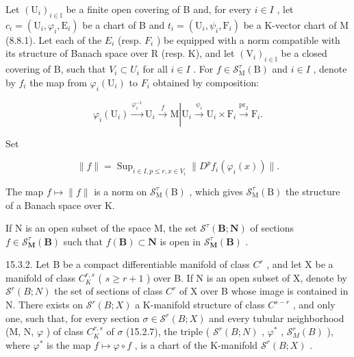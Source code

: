 Let \((\mathrm{U}_{i})_{i\in\mathbb{I}}\) be a finite open covering of B and, for every \(i\in I\) , let \(c_{i}=(\mathrm{U}_{i},\varphi_{i},\mathrm{E}_{i})\) be a chart of B and \(t_{i}=(\mathrm{U}_{i},\psi_{i},\mathrm{F}_{i})\) be a K-vector chart of M (8.8.1). Let each of the \(E_{i}\) (resp. \(F_{i}\) ) be equipped with a norm compatible with its structure of Banach space over R (resp. K), and let \((\mathrm{V}_{i})_{i\in\mathbb{I}}\) be a closed covering of B, such that \(V_{i}\subset U_{i}\) for all \(i\in I\) . For \(f\in\mathcal{S}_{\mathrm{M}}^{\tau}(\mathrm{B})\) and \(i\in I\) , denote by \(f_{i}\) the map from \(\varphi_{i}(\mathrm{U}_{i})\) to \(F_{i}\) obtained by composition:

\[
\varphi_ {i} \left(\mathrm{U} _ {i}\right) \xrightarrow {\varphi_ {i} ^ {- 1}} \mathrm{U} _ {i} \xrightarrow {f} \mathrm{M} \left| \mathrm{U} _ {i} \xrightarrow {\psi_ {i}} \mathrm{U} _ {i} \times \mathrm{F} _ {i} \xrightarrow {\operatorname{pr} _ {2}} \mathrm{F} _ {i}. \right.
\]

Set

\[
\| f \| = \operatorname{Sup} _ {i \in I, p \leqslant r, x \in V _ {i}} \| D ^ {p} f _ {i} (\varphi_ {i} (x)) \|.
\]

The map \(f\mapsto\|f\|\) is a norm on \(\mathcal{S}_{\mathrm{M}}^{\tau}(\mathrm{B})\) , which gives \(\mathcal{S}_{\mathrm{M}}^{\tau}(\mathrm{B})\) the structure of a Banach space over K.

If N is an open subset of the space M, the set \(\mathcal{S}^{\tau}(\mathbf{B};\mathbf{N})\) of sections \(f\in\mathcal{S}_{\mathbf{M}}^{\tau}(\mathbf{B})\) such that \(f(\mathbf{B})\subset\mathbf{N}\) is open in \(\mathcal{S}_{\mathbf{M}}^{\tau}(\mathbf{B})\) .

15.3.2. Let B be a compact differentiable manifold of class \(C^{r}\) , and let X be a manifold of class \(C_{K}^{r,s}\) ( \(s \geqslant r + 1\) ) over B. If N is an open subset of X, denote by \(\mathcal{S}^{r}(B; N)\) the set of sections of class \(C^{r}\) of X over B whose image is contained in N. There exists on \(\mathcal{S}^{r}(B; X)\) a K-manifold structure of class \(C^{s-r}\) , and only one, such that, for every section \(\sigma \in \mathcal{S}^{r}(B; X)\) and every tubular neighborhood (M, N, \(\varphi\) ) of class \(C_{K}^{r,s}\) of \(\sigma\) (15.2.7), the triple ( \(\mathcal{S}^{r}(B; N)\) , \(\varphi^{*}\) , \(\mathcal{S}_{M}^{r}(B)\) ), where \(\varphi^{*}\) is the map \(f \mapsto \varphi \circ f\) , is a chart of the K-manifold \(\mathcal{S}^{r}(B; X)\) .

